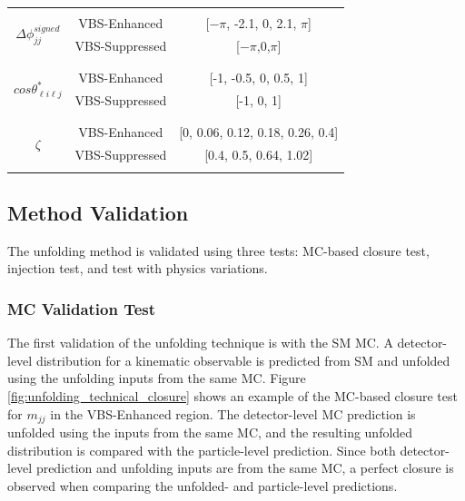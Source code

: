 \begin{table}[!htbp]
\begin{center}
\begin{tabular}{ | c | c | c | }
    & &\\
    \hline
    \multirow{4}{*}{ $\Delta \phi_{jj}^{signed}$ } &  &  \\
    & VBS-Enhanced & [$-\pi$, -2.1, 0, 2.1, $\pi$] \\
    & VBS-Suppressed & [$-\pi$,0,$\pi$] \\
    & & \\
    \hline
    \multirow{4}{*}{ $cos \theta_{\ell i\ell j}^{\ast}$ } &  &  \\
    & VBS-Enhanced & [-1, -0.5, 0, 0.5, 1] \\
    & VBS-Suppressed & [-1, 0, 1]\\
    & & \\
    \hline
    \multirow{4}{*}{ $\zeta$ } &  &  \\
    & VBS-Enhanced &[0, 0.06, 0.12, 0.18, 0.26, 0.4] \\
    & VBS-Suppressed & [0.4, 0.5, 0.64, 1.02]\\
    & &\\
    \hline
    \end{tabular}
    \end{center}
\end{table}

\subsection{Method Validation}
\label{subsec:UnfoldingValidation}
The unfolding method is validated using three tests: MC-based closure test, injection test, and test with physics variations.  

\subsubsection{MC Validation Test}
\label{subsubsec:MCClosure}

The first validation of the unfolding technique is with the SM MC. A detector-level distribution for a kinematic observable is predicted from SM and unfolded using the unfolding inputs from the same MC. Figure \ref{fig:unfolding_technical_closure} shows an example of the MC-based closure test for $m_{jj}$ in the VBS-Enhanced region. The detector-level MC prediction is unfolded using the inputs from the same MC, and the resulting unfolded distribution is compared with the particle-level prediction. Since both detector-level prediction and unfolding inputs are from the same MC, a perfect closure is observed when comparing the unfolded- and particle-level predictions.


